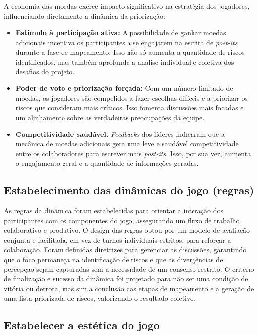 \documentclass[
	12pt,
	openright,
	twoside,
	a4paper,
	english,
	brazil
	]{abntex2}
\begin{document}
A economia das moedas exerce impacto significativo na estratégia dos jogadores, influenciando diretamente a dinâmica da priorização:
\begin{itemize}
\item \textbf{Estímulo à participação ativa:} A possibilidade de ganhar moedas adicionais incentiva os participantes a se engajarem na escrita de \textit{post-its} durante a fase de mapeamento. Isso não só aumenta a quantidade de riscos identificados, mas também aprofunda a análise individual e coletiva dos desafios do projeto.
\item \textbf{Poder de voto e priorização forçada:} Com um número limitado de moedas, os jogadores são compelidos a fazer escolhas difíceis e a priorizar os riscos que consideram mais críticos. Isso fomenta discussões mais focadas e um alinhamento sobre as verdadeiras preocupações da equipe.
\item \textbf{Competitividade saudável:} \textit{Feedbacks} dos líderes indicaram que a mecânica de moedas adicionais gera uma leve e saudável competitividade entre os colaboradores para escrever mais \textit{post-its}. Isso, por sua vez, aumenta o engajamento geral e a quantidade de informações geradas.
\end{itemize}

\subsection{Estabelecimento das dinâmicas do jogo (regras)}
\label{sec:dinamicas-regras}

As regras da dinâmica foram estabelecidas para orientar a interação dos participantes com os componentes do jogo, assegurando um fluxo de trabalho colaborativo e produtivo. O design das regras optou por um modelo de avaliação conjunta e facilitada, em vez de turnos individuais estritos, para reforçar a colaboração. Foram definidas diretrizes para gerenciar as discussões, garantindo que o foco permaneça na identificação de riscos e que as divergências de percepção sejam capturadas sem a necessidade de um consenso restrito. O critério de finalização e sucesso da dinâmica foi projetado para não ser uma condição de vitória ou derrota, mas sim a conclusão das etapas de mapeamento e a geração de uma lista priorizada de riscos, valorizando o resultado coletivo.

\subsection{Estabelecer a estética do jogo}
\label{sec:estetica-jogo}
\end{document}
